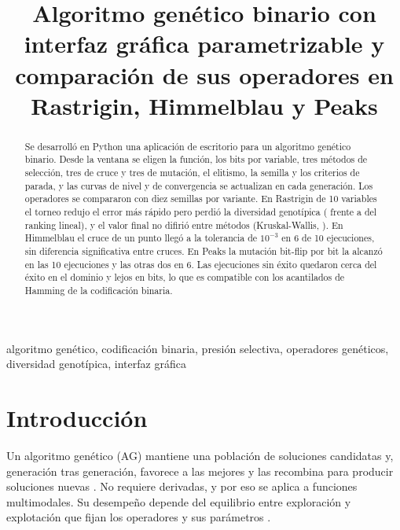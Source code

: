 \documentclass[conference]{IEEEtran}
\begin{document}
\title{Algoritmo genético binario con interfaz gráfica parametrizable y comparación de sus operadores en Rastrigin, Himmelblau y Peaks}

\author{
}

\maketitle

\begin{abstract}
Se desarrolló en Python una aplicación de escritorio para un algoritmo genético binario. Desde la ventana se eligen la función, los bits por variable, tres métodos de selección, tres de cruce y tres de mutación, el elitismo, la semilla y los criterios de parada, y las curvas de nivel y de convergencia se actualizan en cada generación. Los operadores se compararon con diez semillas por variante. En Rastrigin de 10 variables el torneo redujo el error más rápido pero perdió la diversidad genotípica (\EunoDivTorneoGenDoscientos{} frente a \EunoDivRankingGenDoscientos{} del ranking lineal), y el valor final no difirió entre métodos (Kruskal-Wallis, \EunoKruskalP). En Himmelblau el cruce de un punto llegó a la tolerancia de $10^{-3}$ en 6 de 10 ejecuciones, sin diferencia significativa entre cruces. En Peaks la mutación bit-flip por bit la alcanzó en las 10 ejecuciones y las otras dos en 6. Las ejecuciones sin éxito quedaron cerca del éxito en el dominio y lejos en bits, lo que es compatible con los acantilados de Hamming de la codificación binaria.
\end{abstract}

\begin{IEEEkeywords}
algoritmo genético, codificación binaria, presión selectiva, operadores genéticos, diversidad genotípica, interfaz gráfica
\end{IEEEkeywords}

\section{Introducción}

Un algoritmo genético (AG) mantiene una población de soluciones candidatas y, generación tras generación, favorece a las mejores y las recombina para producir soluciones nuevas \cite{holland1975,goldberg1989}. No requiere derivadas, y por eso se aplica a funciones multimodales. Su desempeño depende del equilibrio entre exploración y explotación que fijan los operadores y sus parámetros \cite{eiben2015}.
\end{document}

